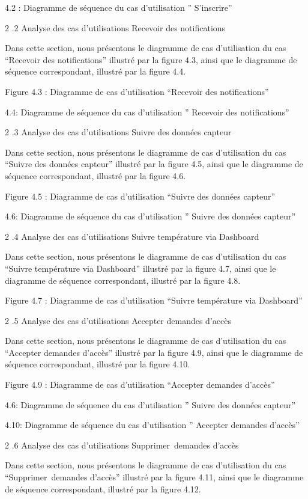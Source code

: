 \documentclass{article}
\begin{document}
4.2 : Diagramme de séquence du cas d’utilisation ” S’inscrire”

2 .2 Analyse des cas d’utilisations Recevoir des notifications

Dans cette section, nous présentons le diagramme de cas d'utilisation du cas “Recevoir des notifications”  illustré par la figure 4.3, ainsi que le diagramme de séquence correspondant, illustré par la figure 4.4.

Figure 4.3 : Diagramme de cas d’utilisation “Recevoir des notifications”

4.4: Diagramme de séquence du cas d’utilisation ” Recevoir des notifications”

2 .3 Analyse des cas d’utilisations Suivre des données capteur

Dans cette section, nous présentons le diagramme de cas d'utilisation du cas “Suivre des données capteur”  illustré par la figure 4.5, ainsi que le diagramme de séquence correspondant, illustré par la figure 4.6.

Figure 4.5 : Diagramme de cas d’utilisation “Suivre des données capteur”

4.6: Diagramme de séquence du cas d’utilisation ” Suivre des données capteur”

2 .4 Analyse des cas d’utilisations Suivre température via Dashboard

Dans cette section, nous présentons le diagramme de cas d'utilisation du cas “Suivre température via Dashboard”  illustré par la figure 4.7, ainsi que le diagramme de séquence correspondant, illustré par la figure 4.8.

Figure 4.7 : Diagramme de cas d’utilisation “Suivre température via Dashboard”

2 .5 Analyse des cas d’utilisations Accepter demandes d’accès

Dans cette section, nous présentons le diagramme de cas d'utilisation du cas “Accepter demandes d’accès”  illustré par la figure 4.9, ainsi que le diagramme de séquence correspondant, illustré par la figure 4.10.

Figure 4.9 : Diagramme de cas d’utilisation “Accepter demandes d’accès”

4.6: Diagramme de séquence du cas d’utilisation ” Suivre des données capteur”

4.10: Diagramme de séquence du cas d’utilisation ” Accepter demandes d’accès”

2 .6 Analyse des cas d’utilisations Supprimer demandes d’accès

Dans cette section, nous présentons le diagramme de cas d'utilisation du cas “Supprimer demandes d’accès”  illustré par la figure 4.11, ainsi que le diagramme de séquence correspondant, illustré par la figure 4.12.
\end{document}

